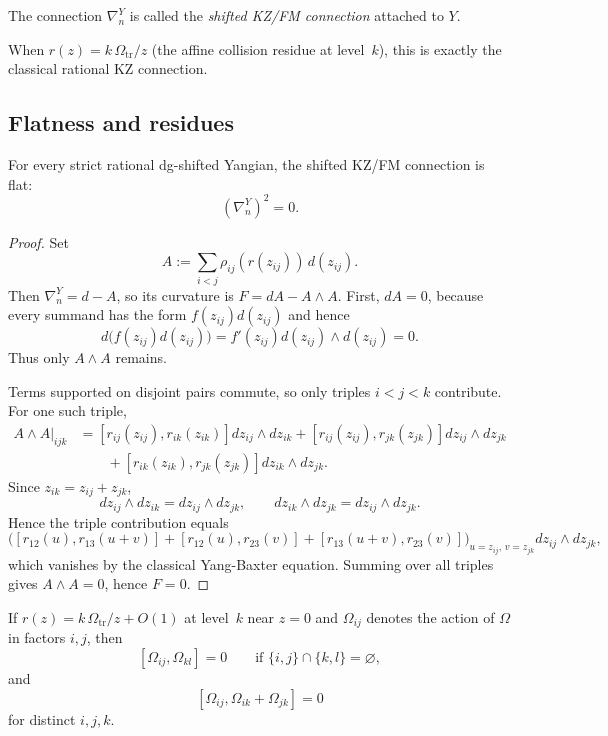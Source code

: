 \begin{definition}
The connection $\nabla_n^Y$ is called the \emph{shifted KZ/FM connection} attached to $Y$.
\end{definition}

When $r(z)=k\,\Omega_{\mathrm{tr}}/z$ (the affine collision residue at level~$k$), this is exactly the classical rational KZ connection.

\subsection{Flatness and residues}

\begin{theorem}\label{thm:strict-flatness}
For every strict rational dg-shifted Yangian, the shifted KZ/FM connection is flat:
\[
 (\nabla_n^Y)^2=0.
\]
\end{theorem}

\begin{proof}
Set
\[
 A:=\sum_{i<j}\rho_{ij}(r(z_{ij}))\,d(z_{ij}).
\]
Then $\nabla_n^Y=d-A$, so its curvature is $F=dA-A\wedge A$. First, $dA=0$, because every summand has the form $f(z_{ij})d(z_{ij})$ and hence
\[
 d\big(f(z_{ij})d(z_{ij})\big)=f'(z_{ij})d(z_{ij})\wedge d(z_{ij})=0.
\]
Thus only $A\wedge A$ remains.

Terms supported on disjoint pairs commute, so only triples $i<j<k$ contribute. For one such triple,
\begin{align*}
 A\wedge A\big|_{ijk}
 &= [r_{ij}(z_{ij}),r_{ik}(z_{ik})]dz_{ij}\wedge dz_{ik}
 + [r_{ij}(z_{ij}),r_{jk}(z_{jk})]dz_{ij}\wedge dz_{jk} \\
 &\qquad + [r_{ik}(z_{ik}),r_{jk}(z_{jk})]dz_{ik}\wedge dz_{jk}.
\end{align*}
Since $z_{ik}=z_{ij}+z_{jk}$,
\[
 dz_{ij}\wedge dz_{ik}=dz_{ij}\wedge dz_{jk},
 \qquad
 dz_{ik}\wedge dz_{jk}=dz_{ij}\wedge dz_{jk}.
\]
Hence the triple contribution equals
\[
 \Big([r_{12}(u),r_{13}(u+v)] + [r_{12}(u),r_{23}(v)] + [r_{13}(u+v),r_{23}(v)]\Big)_{u=z_{ij},\,v=z_{jk}}dz_{ij}\wedge dz_{jk},
\]
which vanishes by the classical Yang-Baxter equation. Summing over all triples gives $A\wedge A=0$, hence $F=0$.
\end{proof}

\begin{lemma}\label{lem:inf-braid}
If $r(z)=k\,\Omega_{\mathrm{tr}}/z+O(1)$ at level~$k$ near $z=0$ and $\Omega_{ij}$ denotes the action of $\Omega$ in factors $i,j$, then
\[
 [\Omega_{ij},\Omega_{kl}]=0 \qquad \text{if }\{i,j\}\cap\{k,l\}=\varnothing,
\]
and
\[
 [\Omega_{ij},\Omega_{ik}+\Omega_{jk}]=0
\]
for distinct $i,j,k$.
\end{lemma}

